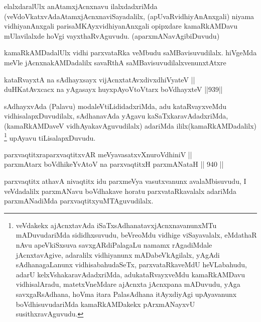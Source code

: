 \begin{artha}
elalxdaralUlx anAtamxjAcnxnavu ilalxdadxriMda (veVdoVkatxvAda\break AtamxjAcnxnaviSayadalilx, (apUvaRvidhiyAnAnxgali) niyama vidhiya\-nAnxgali parisaMKAyxvidhiyanAnxgali opipxdare kamaRkAMDavu mUlavilalxde hoVgi vayxthaRvAguvudu. (aparxmANavAgibiDuvudu)
\end{artha}

\begin{artha}
kamaRkAMDadalUlx vidhi parxvataRka veMbudu saMBavisuvudilalx. hiVgeMda meVle jAcnxnakAMDadalilx savaRthA saMBavisuvudilalxvenunxtAtxre 
\end{artha}

\begin{shl}
kataRvayxtA na sAdhayxsayx vijAcnxtatAvxdivxdhiVyateV || \\
duHKatAvxcacx na yAgasayx huyxpAyoV\s toV\s tarx boVdhayxteV \hfill ||939||  
\end{shl}

\begin{artha}
sAdhayxvAda (Palavu) modaleVtiLididadxriMda, adu kataRvayxveMdu vidhisalapxDuvudilalx, sAdhanavAda yAgavu kaSaTxkaravAdadxriMda,\break (kamaRkAMDaveV vidhAyakavAguvudilalx) adariMda ililx\break (kamaRkAMDadalilx) \footnote{veVdakekx ajAcnxtavAda iSaTxsAdhanatavxjAcnxnavanunxMTu mADuvudariMda sididhxsuvudu, beVreoMdu vidhige viSayavalalx, eMdathaR nAvu apeVkiSxsuva savxgARdiPalagaLu namamx rAgadiMdale jAcnxtavAgive, adaralilx vidhiyanunx mADabeVkAgilalx, yAgAdi sAdhanagaLanunx vidhisabahudaSeTx, parxvataRkaveMdU heVLabahudu, adarU kelxVshakaravAdadxriMda, adukataRvayxveMdu kamaRkAMDavu vidhisalAradu, matetxVneMdare ajAcnxta jAcnxpana mADuvudu, yAga savxgaRsAdhana, hoVma itara PalasAdhana itAyxdiyAgi upAyavanunx boVdhisuvudariMda kamaRkAMDakekx pArxmANayxvU susithxravAguvudu.} upAyavu tiLisalapxDuvudu.
\end{artha}


\begin{shl}
parxvaqtitxraparxvaqtitxvAR meVyavasatxvXnuroVdhiniV || \\
parxmA\s tarx boVdhikeYvAtoV na parxvaqtitxH parxmANataH \hfill || 940 ||  
\end{shl}

\begin{artha}
parxvaqtitx athavA nivaqtitx idu parxmeVya vasutxvanunx avalaMbisuvudu, I veVdadalilx parxmANavu boVdhakave horatu parxvataRkavalalx adariMda parxmANadiMda parxvaqtitxyuMTAguvudilalx.
\end{artha}

